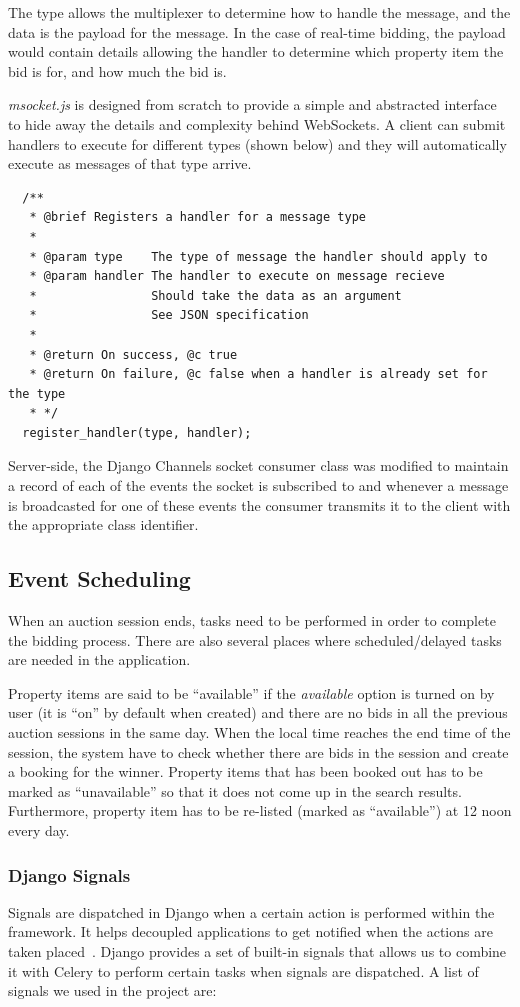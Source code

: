 The type allows the multiplexer to determine how to handle the message, and
the data is the payload for the
message. In the case of real-time bidding, the payload would contain details
allowing the handler to determine which property item the bid is for, and how
much the bid is.

\emph{msocket.js} is designed from scratch to provide a simple and abstracted
interface to hide away the details and complexity behind WebSockets. A client
can submit handlers to execute for different types (shown below) and they will
automatically execute as messages of that type arrive.
\begin{lstlisting}
  /**
   * @brief Registers a handler for a message type
   *
   * @param type    The type of message the handler should apply to
   * @param handler The handler to execute on message recieve
   *                Should take the data as an argument
   *                See JSON specification
   *
   * @return On success, @c true
   * @return On failure, @c false when a handler is already set for the type
   * */
  register_handler(type, handler);
\end{lstlisting}

Server-side, the Django Channels socket consumer class was modified to maintain
a record of each of the events the socket is subscribed to and whenever a
message is broadcasted for one of these events the consumer transmits it to
the client with the appropriate class identifier.

\subsection{Event Scheduling}
When an auction session ends, tasks need to be performed in order to complete
the bidding process. There are also several places where scheduled/delayed tasks
are needed in the application.

Property items are said to be ``available'' if the \emph{available} option is
turned on by user (it is ``on'' by default when created) and there are no bids
in all the previous auction sessions in the same day. When the local time
reaches the end time of the session, the system have to check whether there are
bids in the session and create a booking for the winner. Property items that has
been booked out has to be marked as ``unavailable'' so that it does not come up
in the search results. Furthermore, property item has to be re-listed (marked
as ``available'') at 12 noon every day.

\subsubsection{Django Signals}
Signals are dispatched in Django when a certain action is performed within the
framework. It helps decoupled applications to get notified when the actions are
taken placed~\parencite{django-signals}. Django provides a set of built-in signals
that allows us to combine it with Celery to perform certain tasks when signals
are dispatched. A list of signals we used in the project are:

